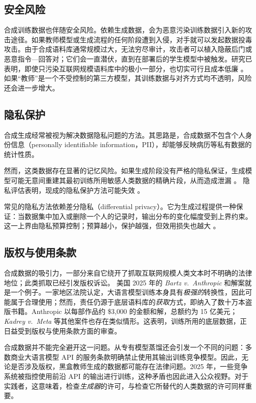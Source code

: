 \subsection{安全风险}
合成训练数据也伴随安全风险。依赖生成数据，会为恶意污染训练数据引入新的攻击途径。如果教师模型或生成流程的任何阶段遭到入侵，对手就可以发起数据投毒攻击。由于合成语料库通常规模过大，无法穷尽审计，攻击者可以植入隐蔽后门或恶意指令—回答对；它们会一直潜伏，直到在部署后的学生模型中被触发。研究已表明，即使只污染互联网规模语料库中的极小一部分，也切实可行且成本低廉 \citep{carlini2024poisoning}。如果“教师”是一个不受控制的第三方模型，其训练数据与对齐方式均不透明，风险还会进一步增大。

\subsection{隐私保护}
合成生成经常被视为解决数据隐私问题的方法。其思路是，合成数据不包含个人身份信息（personally identifiable information，PII）\citep{dwork2014algorithmic}，却能够反映病历等私有数据的统计性质。

然而，这类数据存在显著的记忆风险。如果生成阶段没有严格的隐私保证，生成模型可能无意间重建其最初训练所用敏感人类数据的精确片段，从而造成泄漏 \citep{274574}。
隐私评估表明，现成的隐私保护方法可能失效 \citep{ramesh-etal-2024-evaluating}。

常见的隐私方法依赖差分隐私（differential privacy）\citep{dwork2006calibrating}。它为生成过程提供一种保证：当数据集中加入或删除一个人的记录时，输出分布的变化幅度受到上界约束。这一上界由隐私预算控制；预算越小，保护越强，但效用损失也越大 \citep{yue-etal-2023-synthetic}。


\subsection{版权与使用条款}
合成数据的吸引力，一部分来自它绕开了抓取互联网规模人类文本时不明确的法律地位；此类抓取已经引发版权诉讼。
美国 2025 年的 {\em Bartz v.\ Anthropic} 和解案就是一个例子。一家地区法院认定，大语言模型训练本身具有{\em 极强的}转换性，因此可能属于合理使用；然而，责任仍源于底层语料库的{\em 获取}方式，即纳入了数十万本盗版书籍。Anthropic 以每部作品约 \$3{,}000 的金额和解，总额约为 15 亿美元；{\em Kadrey v.\ Meta} 等其他案件也存在类似情形。这表明，训练所用的底层数据，正日益受到版权与使用条款方面的审查。

合成数据并不能完全避开这一问题。从专有模型蒸馏还会引发一个不同的问题：多数商业大语言模型 API 的服务条款明确禁止使用其输出训练竞争模型。因此，无论是否涉及版权，黑盒教师生成的数据都可能存在法律问题。2025 年，一些竞争系统被指控使用前沿 API 的输出进行训练，这种矛盾也因此进入公众视野。对于实践者，这意味着，检查{\em 生成器}的许可，与检查它所替代的人类数据的许可同样重要。


